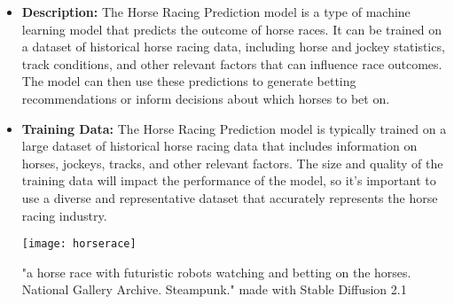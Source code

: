 \begin{itemize}
\item \textbf{Description:} The Horse Racing Prediction model is a type of machine learning model that predicts the outcome of horse races. It can be trained on a dataset of historical horse racing data, including horse and jockey statistics, track conditions, and other relevant factors that can influence race outcomes. The model can then use these predictions to generate betting recommendations or inform decisions about which horses to bet on.
\item \textbf{Training Data:} The Horse Racing Prediction model is typically trained on a large dataset of historical horse racing data that includes information on horses, jockeys, tracks, and other relevant factors. The size and quality of the training data will impact the performance of the model, so it's important to use a diverse and representative dataset that accurately represents the horse racing industry.

\begin{marginfigure}[-5.5cm]
        \texttt{[image: horserace]}
        \caption{"a horse race with futuristic robots watching and betting on the horses. National Gallery Archive. Steampunk." made with Stable Diffusion 2.1}
\end{marginfigure}


\end{itemize}
